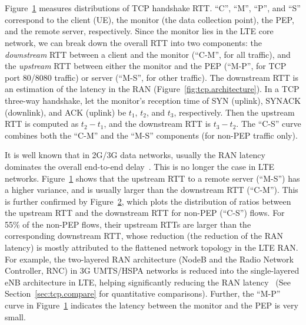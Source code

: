 
\label{sec:tcp.latency}

\begin{figure}[t]
\centering
{}\\
\label{fig:rtt}
\end{figure}

\begin{figure}[t]
\centering
{}\\
\label{fig:rtt_ratio}
\end{figure}

Figure~\ref{fig:rtt} measures distributions of TCP handshake RTT. ``C'', ``M'', ``P'', and ``S'' correspond to the client (UE), the monitor (the data collection point), the PEP, and the remote server, respectively. Since the monitor lies in the LTE core network, we can break down the overall RTT into two components: the \emph{downstream} RTT between a client and the monitor (``C-M'', for all traffic), and the \emph{upstream} RTT between either the monitor and the PEP (``M-P'', for TCP port 80/8080 traffic) or server (``M-S'', for other traffic). The downstream RTT is an estimation of the latency in the RAN (Figure~\ref{fig:tcp.architecture}). In a TCP three-way handshake, let the monitor's reception time of SYN (uplink), SYNACK (downlink), and ACK (uplink) be $t_1$, $t_2$, and $t_3$, respectively. Then the upstream RTT is computed as $t_2-t_1$, and the downstream RTT is $t_3-t_2$. The ``C-S'' curve combines both the ``C-M'' and the ``M-S'' components (for non-PEP traffic only).

It is well known that in 2G/3G data networks, usually the RAN latency dominates the overall end-to-end delay~\cite{sigmetrics.cluster}. This is no longer the case in LTE networks. Figure~\ref{fig:rtt} shows that the upstream RTT to a remote server (``M-S'') has a higher variance, and is usually larger than the downstream RTT (``C-M''). This is further confirmed by Figure~\ref{fig:rtt_ratio}, which plots the distribution of ratios between the upstream RTT and the downstream RTT for  non-PEP (``C-S'') flows. For 55\% of the non-PEP flows, their upstream RTTs are larger than the corresponding downstream RTT, whose reduction (\ie the reduction of the RAN latency) is mostly attributed to the flattened network topology in the LTE RAN. For example, the two-layered RAN architecture (NodeB and the Radio Network Controller, RNC) in 3G UMTS/HSPA networks is reduced into the single-layered eNB architecture in LTE, helping significantly reducing the RAN latency~\cite{4gbook} (See Section~\ref{sec:tcp.compare} for quantitative comparisons).
Further, the ``M-P'' curve in Figure~\ref{fig:rtt} indicates the latency between the monitor and the PEP is very small.

